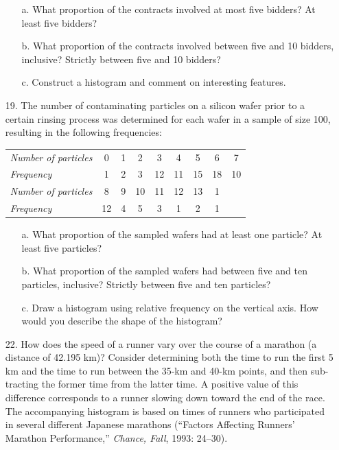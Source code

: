 \documentclass[letterpaper,12pt]{article}
\begin{document}
\begin{enumerate}
    \begin{enumerate}
      \item[a.]
        What proportion of the contracts involved at most five bidders? At least five bidders?
      \item[b.]
        What proportion of the contracts involved between five and 10 bidders, inclusive? Strictly between five and 10 bidders?
      \item[c.]
        Construct a histogram and comment on interesting features.
    \end{enumerate}
  \item[19.]
    The number of contaminating particles on a silicon wafer prior to a certain rinsing process was determined for each wafer in a sample of size 100, resulting in the following frequencies:
    \begin{center}
      \begin{tabular}{
        l
        S[table-format=2.0]
        S[table-format=2.0]
        S[table-format=2.0]
        S[table-format=2.0]
        S[table-format=2.0]
        S[table-format=2.0]
        S[table-format=2.0]
        S[table-format=2.0]
      }
        \textit{Number of particles} & 0 & 1 & 2 & 3 & 4 & 5 & 6 & 7 \\
        \textit{Frequency} & 1 & 2 & 3 & 12 & 11 & 15 & 18 & 10 \\
        \textit{Number of particles} & 8 & 9 & 10 & 11 & 12 & 13 & 1 \\
        \textit{Frequency} & 12 & 4 & 5 & 3 & 1 & 2 & 1
      \end{tabular}
    \end{center}
    \begin{enumerate}
      \item[a.]
        What proportion of the sampled wafers had at least one particle? At least five particles?
      \item[b.]
        What proportion of the sampled wafers had between five and ten particles, inclusive? Strictly between five and ten particles?
      \item[c.]
        Draw a histogram using relative frequency on the vertical axis. How would you describe the shape of the histogram?
    \end{enumerate}
  \item[22.]
    How does the speed of a runner vary over the course of a marathon (a distance of 42.195 km)? Consider determining both the time to run the first 5 km and the time to run between the 35-km and 40-km points, and then sub-
    tracting the former time from the latter time. A positive value of this difference corresponds to a runner slowing down toward the end of the race. The accompanying histogram is based on times of runners who participated in several different Japanese marathons (``Factors Affecting Runners’ Marathon Performance,'' \textit{Chance, Fall}, 1993: 24–30).


\end{enumerate}
\end{document}

